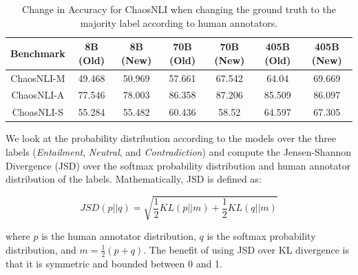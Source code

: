 \begin{table}
    \centering
    \begin{tabular}{c|cc|cc|cc}
    \textbf{Benchmark} & \textbf{8B (Old)} & \textbf{8B (New)} & \textbf{70B (Old)} & \textbf{70B (New)} & \textbf{405B (Old)} & \textbf{405B (New)} \\
    \hline
    ChaosNLI-M & 49.468 & 50.969 & 57.661 & 67.542 & 64.04 & 69.669 \\
    ChaosNLI-A & 77.546 & 78.003 & 86.358 & 87.206 & 85.509 & 86.097 \\
    ChoasNLI-S & 55.284 & 55.482 & 60.436 & 58.52 & 64.597 & 67.305 \\
    \end{tabular}
\caption{Change in Accuracy for ChaosNLI when changing the ground truth to the majority label according to human annotators.}
\label{tab:chaos_acc}
\end{table}

We look at the probability distribution according to the models over the three labels (\textit{Entailment}, \textit{Neutral}, and \textit{Contradiction}) and compute the Jensen-Shannon Divergence (JSD) \citep{menendez1997jensen} over the softmax probability distribution and human annotator distribution of the labels. Mathematically, JSD is defined as:

\begin{equation}
    \scriptstyle JSD(p || q) = \sqrt{\frac{1}{2}KL(p || m) + \frac{1}{2}KL(q || m)}
\end{equation}

where $p$ is the human annotator distribution, $q$ is the softmax probability distribution, and $m = \frac{1}{2}(p + q)$. The benefit of using JSD over KL divergence is that it is symmetric and bounded between 0 and 1.

